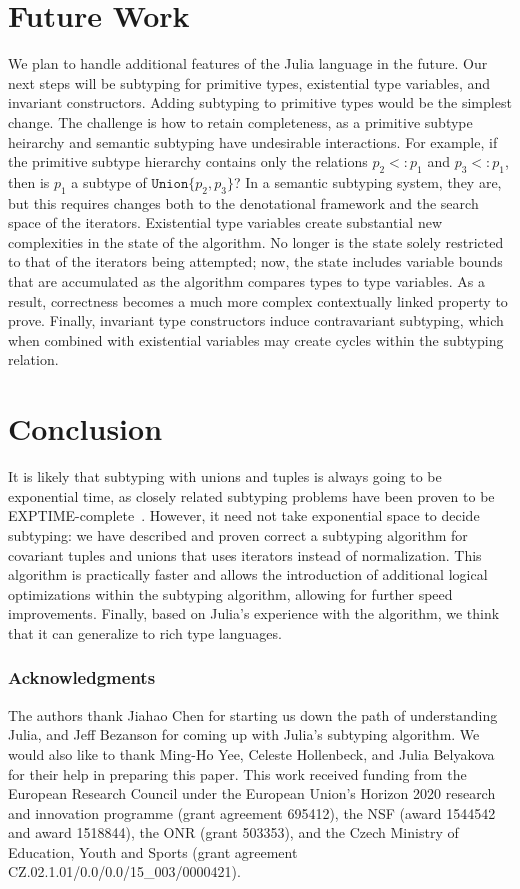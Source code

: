 \documentclass[a4paper,english]{lipics-v2019}
\newcommand{\xt}[1]{\texttt{#1}}
\newcommand{\union}[2]{\xt{Union\{}#1,#2\xt{\}}}
\newcommand{\sub}{<:}
\begin{document}
\section{Future Work}

We plan to handle additional features of the Julia language in the future. Our
next steps will be subtyping for primitive types, existential type variables,
and invariant constructors.  Adding subtyping to primitive types would be the
simplest change. The challenge is how to retain completeness, as a primitive
subtype heirarchy and semantic subtyping have undesirable interactions.  For
example, if the primitive subtype hierarchy contains only the relations $p_2
\sub p_1$ and $p_3 \sub p_1$, then is $p_1$ a subtype of $\union{p_2}{p_3}$?
In a semantic subtyping system, they are, but this requires changes both to
the denotational framework and the search space of the iterators.  Existential
type variables create substantial new complexities in the state of the
algorithm. No longer is the state solely restricted to that of the iterators
being attempted; now, the state includes variable bounds that are accumulated
as the algorithm compares types to type variables. As a result, correctness
becomes a much more complex contextually linked property to prove.  Finally,
invariant type constructors induce contravariant subtyping, which when
combined with existential variables may create cycles within the subtyping
relation.  

\section{Conclusion}

It is likely that subtyping with unions and tuples is always going to be
exponential time, as closely related subtyping problems have been proven
to be EXPTIME-complete~\cite{unionexptime}. However, it need not take
exponential space to decide subtyping: we have described and proven 
correct a subtyping algorithm for covariant tuples and unions that uses 
iterators instead of normalization. This algorithm is practically faster
and allows the introduction of additional logical optimizations within the
subtyping algorithm, allowing for further speed improvements. Finally, 
based on Julia's experience with the algorithm, we think that it can generalize
to rich type languages.



\medskip

\subsubsection*{Acknowledgments} The authors thank Jiahao Chen for starting us
down the path of understanding Julia, and Jeff Bezanson for coming up with
Julia's subtyping algorithm. We would  also like to thank Ming-Ho Yee, Celeste
Hollenbeck, and Julia Belyakova for their help in preparing this paper. This
work received funding from the European Research Council under the European
Union's Horizon 2020 research and innovation programme (grant agreement
695412), the NSF (award 1544542 and award 1518844), the ONR (grant 503353),
and the Czech Ministry of Education, Youth and Sports (grant agreement
CZ.02.1.01/0.0/0.0/15\_003/0000421).
 

%

\end{document}
